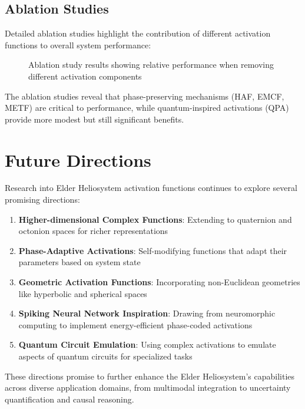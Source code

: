 \subsection{Ablation Studies}

Detailed ablation studies highlight the contribution of different activation functions to overall system performance:

\begin{figure}[h]
\centering
{}
\caption{Ablation study results showing relative performance when removing different activation components}
\end{figure}

The ablation studies reveal that phase-preserving mechanisms (HAF, EMCF, METF) are critical to performance, while quantum-inspired activations (QPA) provide more modest but still significant benefits.

\section{Future Directions}

Research into Elder Heliosystem activation functions continues to explore several promising directions:

\begin{enumerate}
    \item \textbf{Higher-dimensional Complex Functions}: Extending to quaternion and octonion spaces for richer representations
    \item \textbf{Phase-Adaptive Activations}: Self-modifying functions that adapt their parameters based on system state
    \item \textbf{Geometric Activation Functions}: Incorporating non-Euclidean geometries like hyperbolic and spherical spaces
    \item \textbf{Spiking Neural Network Inspiration}: Drawing from neuromorphic computing to implement energy-efficient phase-coded activations
    \item \textbf{Quantum Circuit Emulation}: Using complex activations to emulate aspects of quantum circuits for specialized tasks
\end{enumerate}

These directions promise to further enhance the Elder Heliosystem's capabilities across diverse application domains, from multimodal integration to uncertainty quantification and causal reasoning.